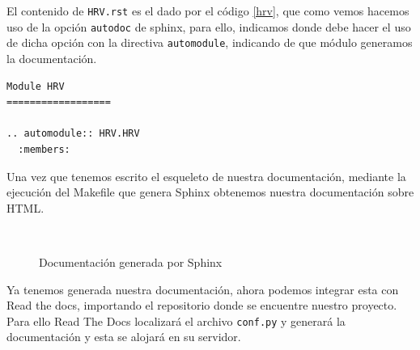 El contenido de \texttt{HRV.rst} es el dado por el código \ref{hrv}, que como vemos hacemos uso de la opción \texttt{autodoc} de sphinx, para ello, indicamos donde debe hacer el uso de dicha opción con la directiva \texttt{automodule}, indicando de que módulo generamos la documentación. \begin{lstlisting}[caption=\texttt{HRV.rst},label=hrv]
Module HRV
==================

.. automodule:: HRV.HRV
  :members:

\end{lstlisting}
Una vez que tenemos escrito el esqueleto de nuestra documentación, mediante la ejecución del Makefile que genera Sphinx obtenemos nuestra documentación sobre HTML.
\begin{figure}[H]
    \centering
    \\
    \caption{Documentación generada por Sphinx}
    \label{fig:sphinx}
\end{figure}

Ya tenemos generada nuestra documentación, ahora podemos integrar esta con Read the docs, importando el repositorio donde se encuentre nuestro proyecto. Para ello Read The Docs localizará el archivo \texttt{conf.py} y generará la documentación y esta se alojará en su servidor. 
